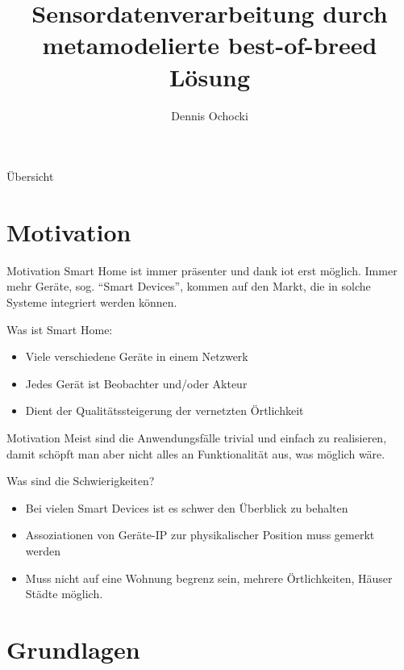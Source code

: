 \documentclass[12pt, pdf, xcolor={table, dvipsnames}, paperheight=8cm,paperwidth=12cm]{beamer}
\author{Dennis Ochocki}
\title[]{Sensordatenverarbeitung durch metamodelierte best-of-breed Lösung}
\begin{document}
	
\maketitle

\begin{frame}{Übersicht}
	\tableofcontents
\end{frame}

\section{Motivation}
\begin{frame}{Motivation}
	Smart Home ist immer präsenter und dank \gls{iot} erst möglich. Immer mehr Geräte, sog. \enquote{Smart Devices}, kommen auf den Markt, die in solche Systeme integriert werden können. 
	
	
	\begin{block}{Was ist Smart Home:}
		\begin{itemize}
			\item Viele verschiedene Geräte in einem Netzwerk
			\item Jedes Gerät ist Beobachter und/oder Akteur
			\item Dient der Qualitätssteigerung der vernetzten Örtlichkeit
		\end{itemize}
	\end{block}
\end{frame}

\begin{frame}{Motivation}
Meist sind die Anwendungsfälle trivial und einfach zu realisieren, damit schöpft man aber nicht alles an Funktionalität aus, was möglich wäre.
\begin{block}{Was sind die Schwierigkeiten?}
	\begin{itemize}
		\item Bei vielen Smart Devices ist es schwer den Überblick zu behalten
		\item Assoziationen von Geräte-IP zur physikalischer Position muss gemerkt werden
		\item Muss nicht auf eine Wohnung begrenz sein, mehrere Örtlichkeiten, Häuser Städte möglich.
	\end{itemize}
\end{block}
\end{frame}


\section{Grundlagen}
\end{document}
